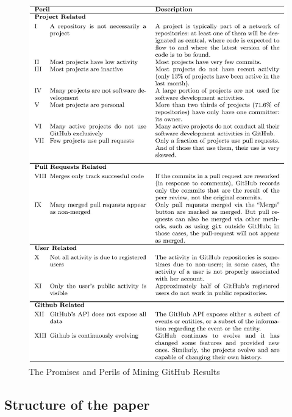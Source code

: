 \begin{figure}
\centering
\includegraphics[scale=1.0]{images/file-page1}
\caption{The Promises and Perils of Mining GitHub Results}
\label{fig:github}
\end{figure}

\subsection{Structure of the paper}